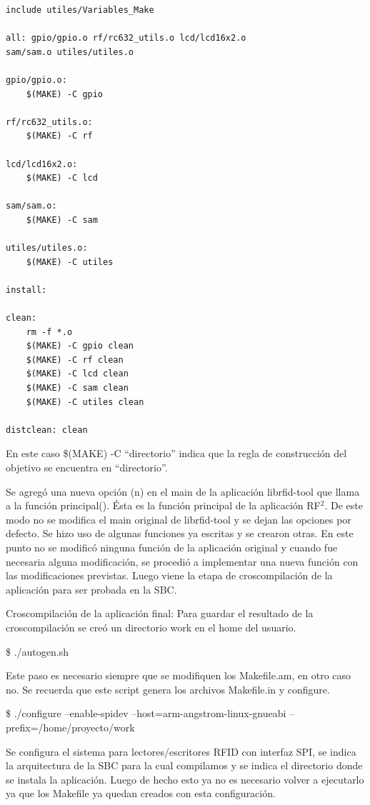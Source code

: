 \begin{verbatim}
include utiles/Variables_Make 

all: gpio/gpio.o rf/rc632_utils.o lcd/lcd16x2.o 
sam/sam.o utiles/utiles.o 

gpio/gpio.o: 
	$(MAKE) -C gpio 

rf/rc632_utils.o: 
	$(MAKE) -C rf 

lcd/lcd16x2.o: 
	$(MAKE) -C lcd 

sam/sam.o: 
	$(MAKE) -C sam 
	 
utiles/utiles.o: 
	$(MAKE) -C utiles 

install: 

clean: 
	rm -f *.o 
	$(MAKE) -C gpio clean 
	$(MAKE) -C rf clean 
	$(MAKE) -C lcd clean 
	$(MAKE) -C sam clean 
	$(MAKE) -C utiles clean 

distclean: clean
\end{verbatim}

\bigskip
En este caso \$(MAKE) -C “directorio” indica que la regla de construcción del objetivo se encuentra en “directorio”.

\bigskip
Se agregó una nueva opción (n) en el main de la aplicación librfid-tool que llama a la función principal(). Ésta es la función principal de la aplicación RF$^{2}$. De este modo no se modifica el main original de librfid-tool y se dejan las opciones por defecto.
Se hizo uso de algunas funciones ya escritas y se crearon otras. En este punto no se modificó ninguna función de la aplicación original y cuando fue necesaria alguna modificación, se procedió a implementar una nueva función con las modificaciones previstas.
Luego viene la etapa de croscompilación de la aplicación para ser probada en la SBC.

\bigskip
Croscompilación de la aplicación final:
Para guardar el resultado de la croscompilación se creó un directorio work en el home del usuario.

\bigskip
\centerline{\$ ./autogen.sh}
Este paso es necesario siempre que se modifiquen los Makefile.am, en otro caso no. Se recuerda que este script genera los archivos Makefile.in y configure.

\bigskip
\centerline{\$ ./configure --enable-spidev --host=arm-angstrom-linux-gnueabi --prefix=/home/proyecto/work}
Se configura el sistema para lectores/escritores RFID con interfaz SPI, se indica la arquitectura de la SBC para la cual compilamos y se indica el directorio donde se instala la aplicación. Luego de hecho esto ya no es necesario volver a ejecutarlo ya que los Makefile ya quedan creados con esta configuración.

